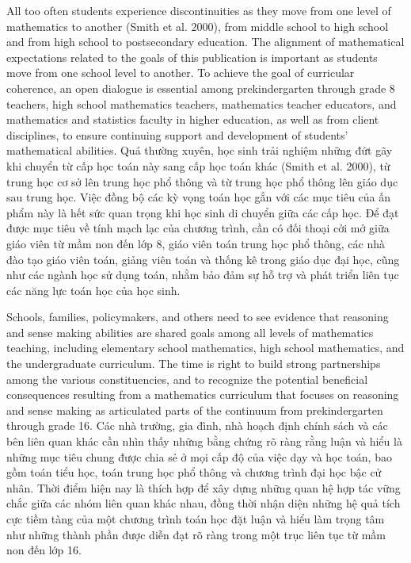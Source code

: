 \documentclass[
  10pt,
  a4paper,
  landscape,
  twoside,
  openany
]{scrbook}
\newcommand{\EN}[1]{#1}
\newcommand{\VI}[1]{#1}
\newcommand{\NOTE}[1]{#1}
\begin{document}
\TriPara
{
\EN{All too often students experience discontinuities as they move from one level of mathematics to another (Smith et al. 2000), from middle school to high school and from high school to postsecondary education. The alignment of mathematical expectations related to the goals of this publication is important as students move from one school level to another. To achieve the goal of curricular coherence, an open dialogue is essential among prekindergarten through grade 8 teachers, high school mathematics teachers, mathematics teacher educators, and mathematics and statistics faculty in higher education, as well as from client disciplines, to ensure continuing support and development of students' mathematical abilities.}
}
{
\VI{Quá thường xuyên, học sinh trải nghiệm những đứt gãy khi chuyển từ cấp học toán này sang cấp học toán khác (Smith et al. 2000), từ trung học cơ sở lên trung học phổ thông và từ trung học phổ thông lên giáo dục sau trung học. Việc đồng bộ các kỳ vọng toán học gắn với các mục tiêu của ấn phẩm này là hết sức quan trọng khi học sinh di chuyển giữa các cấp học. Để đạt được mục tiêu về tính mạch lạc của chương trình, cần có đối thoại cởi mở giữa giáo viên từ mầm non đến lớp 8, giáo viên toán trung học phổ thông, các nhà đào tạo giáo viên toán, giảng viên toán và thống kê trong giáo dục đại học, cũng như các ngành học sử dụng toán, nhằm bảo đảm sự hỗ trợ và phát triển liên tục các năng lực toán học của học sinh.}
}
{
\NOTE{}
}

\TriPara
{
\EN{Schools, families, policymakers, and others need to see evidence that reasoning and sense making abilities are shared goals among all levels of mathematics teaching, including elementary school mathematics, high school mathematics, and the undergraduate curriculum. The time is right to build strong partnerships among the various constituencies, and to recognize the potential beneficial consequences resulting from a mathematics curriculum that focuses on reasoning and sense making as articulated parts of the continuum from prekindergarten through grade 16.}
}
{
\VI{Các nhà trường, gia đình, nhà hoạch định chính sách và các bên liên quan khác cần nhìn thấy những bằng chứng rõ ràng rằng luận và hiểu là những mục tiêu chung được chia sẻ ở mọi cấp độ của việc dạy và học toán, bao gồm toán tiểu học, toán trung học phổ thông và chương trình đại học bậc cử nhân. Thời điểm hiện nay là thích hợp để xây dựng những quan hệ hợp tác vững chắc giữa các nhóm liên quan khác nhau, đồng thời nhận diện những hệ quả tích cực tiềm tàng của một chương trình toán học đặt luận và hiểu làm trọng tâm như những thành phần được diễn đạt rõ ràng trong một trục liên tục từ mầm non đến lớp 16.}
}
{
\NOTE{}
}
\end{document}
